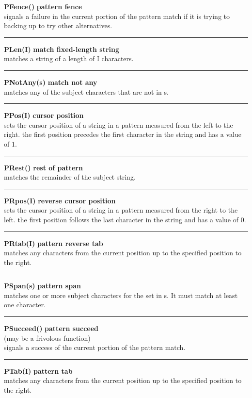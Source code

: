 \documentclass{article}
\begin{document}
\noindent\textbf{PFence()} \hfill\textbf{pattern fence}\\
signals a failure in the current portion of the pattern match if it is trying to backing up to try other alternatives.\\
\noindent\rule{12cm}{0.1pt}

\noindent\textbf{PLen(I)} \hfill\textbf{match fixed-length string}\\
matches a string of a length of I characters.\\
\noindent\rule{12cm}{0.1pt}

\noindent\textbf{PNotAny(s)} \hfill\textbf{match not any}\\
matches any of the subject characters that are not in s.\\
\noindent\rule{12cm}{0.1pt}

\noindent\textbf{PPos(I)} \hfill\textbf{cursor position}\\
sets the cursor position of a string in a pattern measured from the left to the right. the first position precedes the first character in the string and has a value of 1.\\
\noindent\rule{12cm}{0.1pt}

\noindent\textbf{PRest()} \hfill\textbf{rest of pattern}\\
matches the remainder of the subject string.\\
\noindent\rule{12cm}{0.1pt}

\noindent\textbf{PRpos(I)} \hfill\textbf{reverse cursor position}\\
sets the cursor position of a string in a pattern measured from the right to the left. the first position follows the last character in the string and has a value of 0.\\
\noindent\rule{12cm}{0.1pt}

\noindent\textbf{PRtab(I)} \hfill\textbf{pattern reverse tab}\\
matches any characters from the current position up to the specified position to the right.\\
\noindent\rule{12cm}{0.1pt}

\noindent\textbf{PSpan(s)} \hfill\textbf{pattern span}\\
matches one or more subject characters for the set in s.  It must match at least one character.\\
\noindent\rule{12cm}{0.1pt}

\noindent\textbf{PSucceed()} \hfill\textbf{pattern succeed}\\
(may be a frivolous function)\\
signals a success of the current portion of the pattern match.\\
\noindent\rule{12cm}{0.1pt}

\noindent\textbf{PTab(I)} \hfill\textbf{pattern tab}\\
matches any characters from the current position up to the specified position to the right.
\end{document}
